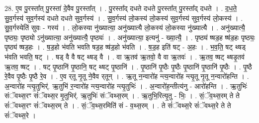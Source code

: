\documentclass[17pt]{extarticle}
\begin{document}
28. ए॒व पु॒रस्ता᳚त् पु॒रस्ता॑ दे॒वैव पु॒रस्ता᳚त् । . पु॒रस्ता᳚द् दधते दधते पु॒रस्ता᳚त् पु॒रस्ता᳚द् दधते । . द॒ध॒ते॒ सु॒व॒र्गस्य॑ सुव॒र्गस्य॑ दधते दधते सुव॒र्गस्य॑ । . सु॒व॒र्गस्य॑ लो॒कस्य॑ लो॒कस्य॑ सुव॒र्गस्य॑ सुव॒र्गस्य॑ लो॒कस्य॑ । . सु॒व॒र्गस्येति॑ सुवः - गस्य॑ । . लो॒कस्या नु॑ख्यात्या॒ अनु॑ख्यात्यै लो॒कस्य॑ लो॒कस्या नु॑ख्यात्यै । . अनु॑ख्यात्यै॒ पृष्ठ्यः॒ पृष्ठ्यो ऽनु॑ख्यात्या॒ अनु॑ख्यात्यै॒ पृष्ठ्यः॑ । . अनु॑ख्यात्या॒ इत्यनु॑ - ख्या॒त्यै॒ । . पृष्ठ्य॑ ष्षड॒ह ष्ष॑ड॒हः पृष्ठ्यः॒ पृष्ठ्य॑ ष्षड॒हः । . ष॒ड॒हो भ॑वति भवति षड॒ह ष्ष॑ड॒हो भ॑वति । . ष॒ड॒ह इति॑ षट् - अ॒हः । . भ॒व॒ति॒ षट् थ्षड् भ॑वति भवति॒ षट् । . षड् वै वै षट् थ्षड् वै । . वा ऋ॒तव॑ ऋ॒तवो॒ वै वा ऋ॒तवः॑ । . ऋ॒तव॒ ष्षट् थ्षडृ॒तव॑ ऋ॒तव॒ ष्षट् । . षट् पृ॒ष्ठानि॑ पृ॒ष्ठानि॒ षट् थ्षट् पृ॒ष्ठानि॑ । . पृ॒ष्ठानि॑ पृ॒ष्ठैः पृ॒ष्ठैः पृ॒ष्ठानि॑ पृ॒ष्ठानि॑ पृ॒ष्ठैः । . पृ॒ष्ठै रे॒वैव पृ॒ष्ठैः पृ॒ष्ठै रे॒व । . ए॒व र्‌तू नृ॒तू ने॒वैव र्‌तून् । . ऋ॒तू न॒न्वारो॑ह न्त्य॒न्वारो॑ह न्त्यृ॒तू नृ॒तू न॒न्वारो॑हन्ति । . अ॒न्वारो॑ह न्त्यृ॒तुभिर्॑. ऋ॒तुभि॑ र॒न्वारो॑ह न्त्य॒न्वारो॑ह न्त्यृ॒तुभिः॑ । . अ॒न्वारो॑ह॒न्तीत्य॑नु - आरो॑हन्ति । . ऋ॒तुभिः॑ संॅवथ्स॒रꣳ सं॑ॅवथ्स॒र मृ॒तुभिर्॑. ऋ॒तुभिः॑ संॅवथ्स॒रम् । . ऋ॒तुभि॒रित्यृ॒तु - भिः॒ । . सं॒ॅव॒थ्स॒रम् ते ते सं॑ॅवथ्स॒रꣳ सं॑ॅवथ्स॒रम् ते । . सं॒ॅव॒थ्स॒रमिति॑ सं - व॒थ्स॒रम् । . ते सं॑ॅवथ्स॒रे सं॑ॅवथ्स॒रे ते ते सं॑ॅवथ्स॒रे । \newline
\end{document}
